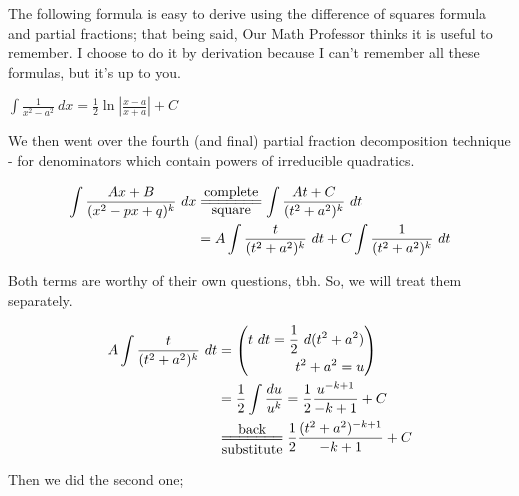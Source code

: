 \documentclass{article}
\begin{document}
The following formula is easy to derive using the difference of squares formula and partial fractions; that being said, Our Math Professor thinks it is useful to remember. I choose to do it by derivation because I can't remember all these formulas, but it's up to you.

\begin{center}
$\displaystyle\boxed{\int\frac{1}{x^2-a^2}\ dx=\frac{1}{2}\ln\left|\frac{x-a}{x+a}\right|+C}$
\end{center}

\vspace{10pt}

We then went over the fourth (and final) partial fraction decomposition technique - for denominators which contain powers of irreducible quadratics.

\begin{align*}
\int\frac{Ax+B}{(x^2-px+q)^k}\ dx&\overset{\mbox{complete}}{\underset{\mbox{square}}{=\joinrel=\joinrel=\joinrel=\joinrel=\joinrel=\joinrel=}}\int\frac{At+C}{(t^2+a^2)^k}\ dt\\
&=A\int\frac{t}{(t^2+a^2)^k}\ dt+C\int\frac{1}{(t^2+a^2)^k}\ dt\\
\end{align*}

\vspace{10pt}

Both terms are worthy of their own questions, tbh. So, we will treat them separately.

\begin{align*}
A\int\frac{t}{(t^2+a^2)^k}\ dt&=\left(\begin{aligned}t\ dt=\frac{1}{2}\ d(t^2+a^2)\\t^2+a^2=u\end{aligned}\right)\\
&=\frac{1}{2}\int\frac{du}{u^k}=\frac{1}{2}\frac{u^{-k+1}}{-k+1}+C\\
&\overset{\mbox{back}}{\underset{\mbox{substitute}}{=\joinrel=\joinrel=\joinrel=\joinrel=\joinrel=\joinrel=}}\frac{1}{2}\frac{(t^2+a^2)^{-k+1}}{-k+1}+C
\end{align*}

\vspace{10pt}

Then we did the second one;
\end{document}
